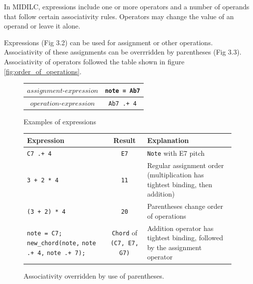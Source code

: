 \documentclass[12pt,A4]{book}
\begin{document}
In MIDILC, expressions include one or more operators and a number of operands that follow certain associativity rules. Operators may change the value of an operand or leave it alone. 

Expressions (Fig 3.2) can be used for assignment or other operations. Associativity of these assignments can be overrridden by parentheses (Fig 3.3). Associativity of operators followed the table shown in figure \ref{fig:order_of_operations}.

\begin{figure}
\center
\begin{tabular}{|c|c|}
\hline
$assignment\mbox{-}expression$  & \verb|note = Ab7| \\ \hline
$operation\mbox{-}expression$   & \verb|Ab7 .+ 4| \\ \hline
\end{tabular}
\label{fig:expressions}
\caption{Examples of expressions}
\end{figure}
\begin{figure}
\center
\begin{tabular}{|p{}|c|p{}|}
\hline
Expression & Result & Explanation \\ \hline
\verb|C7 .+ 4| & \verb|E7| & \verb|Note| with E7 pitch \\ \hline
\verb|3 + 2 * 4| & \verb|11| &	Regular assignment order (multiplication has tightest binding, then addition) \\ \hline
\verb|(3 + 2) * 4| &\verb|20| & Parentheses change order of operations \\ \hline
\verb|note = C7;| \verb|new_chord(note,| \verb|note .+ 4,| \verb|note .+ 7);| & \verb|Chord| of \verb|(C7, E7, G7)| & Addition operator has tightest binding, followed by the assignment operator \\ \hline
\end{tabular}
\label{fig:associativity}
\caption{Associativity overridden by use of parentheses.}
\end{figure}
\end{document}
